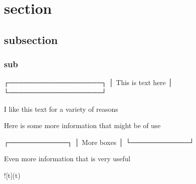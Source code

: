 \documentclass{article}
\begin{document}
\section{section}

\subsection{subsection}

\subsubsection{sub}
┌───────────────────┐
│ This is text here │
└───────────────────┘

I like this text for a variety of reasons

Here is some more information that might be of use
 
┌────────────┐
│ More boxes │
└────────────┘

Even more information that is very useful



![t](t)
\end{document}
